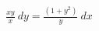\documentclass[preview]{standalone}
\begin{document}
\begin{align*}
\frac{x y}{x} \  dy = \frac{\left( 1 + {y}^{2} \right)}{y} \  dx
\end{align*}
\end{document}
